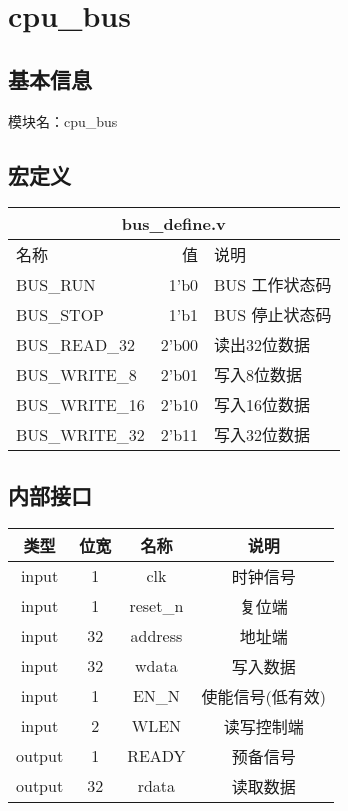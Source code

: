 \section{cpu\_bus}
\subsection{基本信息}
模块名：cpu\_bus\\
\subsection{宏定义}
\begin{tabular}{|l|r|l|}
    \hline
    \multicolumn{3}{|c|}{bus\_define.v}\\\hline
    名称    &   值  &   说明\\\hline
    BUS\_RUN     &      1'b0   &  BUS 工作状态码\\ \hline
    BUS\_STOP    &      1'b1   &  BUS 停止状态码\\ \hline
    BUS\_READ\_32  & 2'b00 & 读出32位数据 \\ \hline
    BUS\_WRITE\_8  & 2'b01 & 写入8位数据 \\ \hline
    BUS\_WRITE\_16 & 2'b10 & 写入16位数据 \\ \hline
    BUS\_WRITE\_32 & 2'b11 & 写入32位数据 \\ \hline
\end{tabular}
\subsection{内部接口}
\begin{tabular}{|c|c|c|c|}
    \hline
    类型        &   位宽    &   名称    &   说明\\\hline
    input       &   1      &    clk     &   时钟信号\\\hline
    input       &   1      &    reset\_n  &   复位端\\\hline
    input       &   32     &    address &   地址端\\\hline
    input       &   32      &   wdata   &   写入数据\\\hline
    input       &   1       &   EN\_N   &   使能信号(低有效)\\\hline
    input       &   2       &   WLEN   &   读写控制端\\\hline
    output      &   1       &   READY   &   预备信号\\\hline
    output      &   32      &   rdata   &   读取数据\\\hline
\end{tabular}
